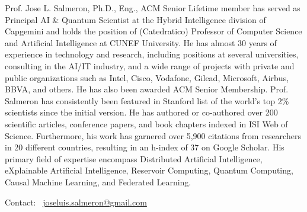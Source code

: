 Prof. Jose L. Salmeron, Ph.D., Eng., ACM Senior Lifetime member has served as Principal AI \& Quantum Scientist at the Hybrid Intelligence division of Capgemini and holds the position of (Catedratico) Professor of Computer Science and Artificial Intelligence at CUNEF University. He has almost 30 years of experience in technology and research, including positions at several universities, consulting in the AI/IT industry, and a wide range of projects with private and public organizations such as Intel, Cisco, Vodafone, Gilead, Microsoft, Airbus, BBVA, and others. He has also been awarded ACM Senior Membership. Prof. Salmeron has consistently been featured in Stanford list of the world’s top 2\% scientists since the initial version. He has authored or co-authored over 200 scientific articles, conference papers, and book chapters indexed in ISI Web of Science. Furthermore, his work has garnered over 5,900 citations from researchers in 20 different countries, resulting in an h-index of 37 on Google Scholar. His primary field of expertise encompass Distributed Artificial Intelligence, eXplainable Artificial Intelligence, Reservoir Computing, Quantum Computing, Causal Machine Learning, and Federated Learning.

Contact: \faEnvelope\ \href{mailto:joseluis.salmeron@gmail.com}{joseluis.salmeron@gmail.com}